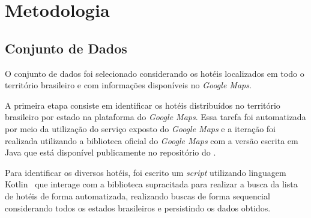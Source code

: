 \chapter{Metodologia}
\label{cap:metodologia}


\section{Conjunto de Dados}
\label{cap:metodologia:sec:conjunto_dados}


O conjunto de dados foi selecionado considerando os hotéis localizados em todo o território brasileiro e com informações disponíveis no \textit{Google Maps}.

A primeira etapa consiste em identificar os hotéis distribuídos no território brasileiro por estado na plataforma do \textit{Google Maps}. Essa tarefa foi automatizada por meio da utilização do serviço exposto do \textit{Google Maps} e a iteração foi realizada utilizando a biblioteca oficial do \textit{Google Maps} com a versão escrita em Java que está disponível publicamente no repositório do .

Para identificar os diversos hotéis, foi escrito um \emph{script} utilizando linguagem Kotlin~\cite{kotlin_lang:2024, scriptKotlinBuscarHoteis} que interage com a biblioteca supracitada para realizar a busca da lista de hotéis de forma automatizada, realizando buscas de forma sequencial considerando todos os estados brasileiros e persistindo os dados obtidos.

